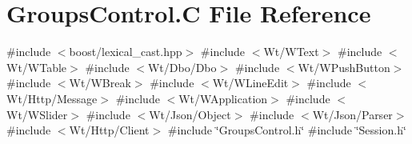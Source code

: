 \hypertarget{_groups_control_8_c}{}\section{Groups\+Control.\+C File Reference}
\label{_groups_control_8_c}
{\ttfamily \#include $<$boost/lexical\+\_\+cast.\+hpp$>$}\newline
{\ttfamily \#include $<$Wt/\+W\+Text$>$}\newline
{\ttfamily \#include $<$Wt/\+W\+Table$>$}\newline
{\ttfamily \#include $<$Wt/\+Dbo/\+Dbo$>$}\newline
{\ttfamily \#include $<$Wt/\+W\+Push\+Button$>$}\newline
{\ttfamily \#include $<$Wt/\+W\+Break$>$}\newline
{\ttfamily \#include $<$Wt/\+W\+Line\+Edit$>$}\newline
{\ttfamily \#include $<$Wt/\+Http/\+Message$>$}\newline
{\ttfamily \#include $<$Wt/\+W\+Application$>$}\newline
{\ttfamily \#include $<$Wt/\+W\+Slider$>$}\newline
{\ttfamily \#include $<$Wt/\+Json/\+Object$>$}\newline
{\ttfamily \#include $<$Wt/\+Json/\+Parser$>$}\newline
{\ttfamily \#include $<$Wt/\+Http/\+Client$>$}\newline
{\ttfamily \#include \char`\"{}Groups\+Control.\+h\char`\"{}}\newline
{\ttfamily \#include \char`\"{}Session.\+h\char`\"{}}\newline
